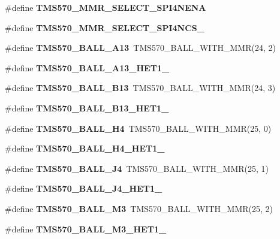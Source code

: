 \begin{DoxyCompactItemize}
\item 
\#define {\bfseries T\+M\+S570\+\_\+\+M\+M\+R\+\_\+\+S\+E\+L\+E\+C\+T\+\_\+\+S\+P\+I4\+N\+E\+NA}
\item 
\#define {\bfseries T\+M\+S570\+\_\+\+M\+M\+R\+\_\+\+S\+E\+L\+E\+C\+T\+\_\+\+S\+P\+I4\+N\+C\+S\+\_}
\item 
\mbox{\label{tms570ls3137zwt-pins_8h_a505e115e30eee869acbfd353831effef}} 
\#define {\bfseries T\+M\+S570\+\_\+\+B\+A\+L\+L\+\_\+\+A13}~T\+M\+S570\+\_\+\+B\+A\+L\+L\+\_\+\+W\+I\+T\+H\+\_\+\+M\+MR(24, 2)
\item 
\#define {\bfseries T\+M\+S570\+\_\+\+B\+A\+L\+L\+\_\+\+A13\+\_\+\+H\+E\+T1\+\_}
\item 
\mbox{\label{tms570ls3137zwt-pins_8h_aecebac647119702ae531413876d65ccf}} 
\#define {\bfseries T\+M\+S570\+\_\+\+B\+A\+L\+L\+\_\+\+B13}~T\+M\+S570\+\_\+\+B\+A\+L\+L\+\_\+\+W\+I\+T\+H\+\_\+\+M\+MR(24, 3)
\item 
\#define {\bfseries T\+M\+S570\+\_\+\+B\+A\+L\+L\+\_\+\+B13\+\_\+\+H\+E\+T1\+\_}
\item 
\mbox{\label{tms570ls3137zwt-pins_8h_a2e14c53c19eb2dc53718652e80281a04}} 
\#define {\bfseries T\+M\+S570\+\_\+\+B\+A\+L\+L\+\_\+\+H4}~T\+M\+S570\+\_\+\+B\+A\+L\+L\+\_\+\+W\+I\+T\+H\+\_\+\+M\+MR(25, 0)
\item 
\#define {\bfseries T\+M\+S570\+\_\+\+B\+A\+L\+L\+\_\+\+H4\+\_\+\+H\+E\+T1\+\_}
\item 
\mbox{\label{tms570ls3137zwt-pins_8h_a0441d79ba03276635343448bf86eab70}} 
\#define {\bfseries T\+M\+S570\+\_\+\+B\+A\+L\+L\+\_\+\+J4}~T\+M\+S570\+\_\+\+B\+A\+L\+L\+\_\+\+W\+I\+T\+H\+\_\+\+M\+MR(25, 1)
\item 
\#define {\bfseries T\+M\+S570\+\_\+\+B\+A\+L\+L\+\_\+\+J4\+\_\+\+H\+E\+T1\+\_}
\item 
\mbox{\label{tms570ls3137zwt-pins_8h_a973225f5064f9096fa5f9d30eedb5766}} 
\#define {\bfseries T\+M\+S570\+\_\+\+B\+A\+L\+L\+\_\+\+M3}~T\+M\+S570\+\_\+\+B\+A\+L\+L\+\_\+\+W\+I\+T\+H\+\_\+\+M\+MR(25, 2)
\item 
\#define {\bfseries T\+M\+S570\+\_\+\+B\+A\+L\+L\+\_\+\+M3\+\_\+\+H\+E\+T1\+\_}
\item 
\mbox{\label{tms570ls3137zwt-pins_8h_a48f32b986204f7f8ba9ae1ff55bc6623}} 

\end{DoxyCompactItemize}
